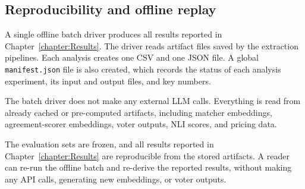 \subsection{Reproducibility and offline replay}\label{subsec:eval-reprod-and-offline-replay}

A single offline batch driver produces all results reported in Chapter~\ref{chapter:Results}. The driver reads artifact files saved by the extraction pipelines. Each analysis creates one CSV and one JSON file. A global \texttt{manifest.json} file is also created, which records the status of each analysis experiment, its input and output files, and key numbers. 

The batch driver does not make any external LLM calls. Everything is read from already cached or pre-computed artifacts, including matcher embeddings, agreement-scorer embeddings, voter outputs, NLI scores, and pricing data. 


The evaluation sets are frozen, and all results reported in Chapter~\ref{chapter:Results} are reproducible from the stored artifacts. A reader can re-run the offline batch and re-derive the reported results, without making any API calls, generating new embeddings, or voter outputs.